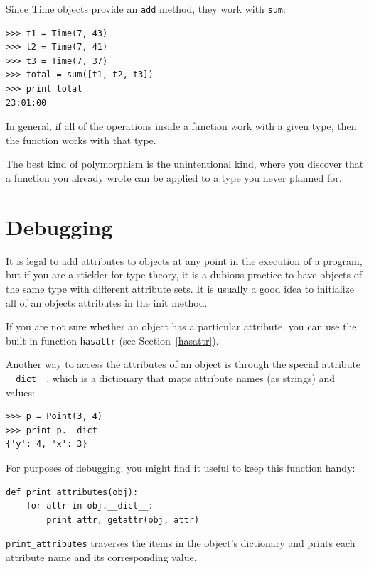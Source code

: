 \documentclass[10pt]{book}
\begin{document}
\begin{CJK}{UTF8}{gbsn}
Since Time objects provide an {\tt add} method, they work
with {\tt sum}:

\begin{verbatim}
>>> t1 = Time(7, 43)
>>> t2 = Time(7, 41)
>>> t3 = Time(7, 37)
>>> total = sum([t1, t2, t3])
>>> print total
23:01:00
\end{verbatim}
%
In general, if all of the operations inside a function 
work with a given type, then the function works with that type.

The best kind of polymorphism is the unintentional kind, where
you discover that a function you already wrote can be
applied to a type you never planned for.


\section{Debugging}

It is legal to add attributes to objects at any point in the execution
of a program, but if you are a stickler for type theory, it is a
dubious practice to have objects of the same type with different
attribute sets.  It is usually a good idea to
initialize all of an objects attributes in the init method.

If you are not sure whether an object has a particular attribute, you
can use the built-in function {\tt hasattr} (see Section~\ref{hasattr}).

Another way to access the attributes of an object is through the
special attribute \verb"__dict__", which is a dictionary that maps
attribute names (as strings) and values:

\begin{verbatim}
>>> p = Point(3, 4)
>>> print p.__dict__
{'y': 4, 'x': 3}
\end{verbatim}
%
For purposes of debugging, you might find it useful to keep this
function handy:

\begin{verbatim}
def print_attributes(obj):
    for attr in obj.__dict__:
        print attr, getattr(obj, attr)
\end{verbatim}
%
\verb"print_attributes" traverses the items in the object's dictionary
and prints each attribute name and its corresponding value.


\end{CJK}
\end{document}
